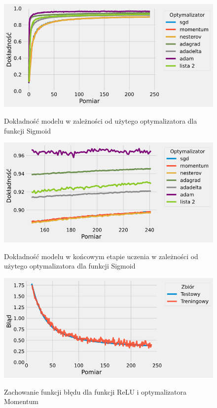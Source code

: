 \documentclass{article}
\begin{document}
\begin{figure}[H]
	\centering
	\caption{Dokładność modelu w zależności od użytego optymalizatora dla funkcji Sigmoid}
	\includegraphics[width=\textwidth]{opt_sig_acc.png}
	\label{fig:res110}
\end{figure}
\begin{figure}[H]
	\centering
	\caption{Dokładność modelu w końcowym etapie uczenia w zależności od użytego optymalizatora dla funkcji Sigmoid}
	\includegraphics[width=\textwidth]{opt_sig_acc_zoom.png}
	\label{fig:res111}
\end{figure}
\begin{figure}[H]
	\centering
	\caption{Zachowanie funkcji błędu dla funkcji ReLU i optymalizatora Momentum}
	\includegraphics[width=\textwidth]{sig_mom_err.png}
	\label{fig:res112}
\end{figure}
\end{document}
